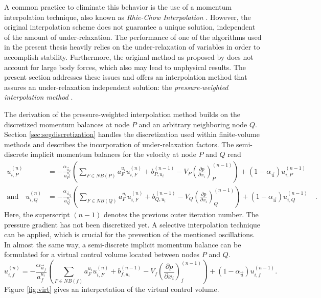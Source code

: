 A common practice to eliminate this behavior is the use of a momentum interpolation technique, also known as \emph{Rhie-Chow Interpolation} \cite{rhie82}. However, the original interpolation scheme does not guarantee a unique solution, independent of the amount of under-relaxation. The performance of one of the algorithms used in the present thesis heavily relies on the under-relaxation of variables in order to accomplish stability. Furthermore, the original method as proposed by \cite{rhie82} does not account for large body forces, which also may lead to unphysical results. The present section addresses these issues and offers an interpolation method that assures an under-relaxation independent solution: the \emph{pressure-weighted interpolation method} \cite{miller88}.

The derivation of the pressure-weighted interpolation method builds on the discretized momentum balances at node \(P\) and an arbitrary neighboring node \(Q\). Section \ref{sec:segdiscretization} handles the discretization used within finite-volume methods and describes the incorporation of under-relaxation factors. The semi-discrete implicit momentum balances for the velocity at node \(P\) and \(Q\) read
\begin{align*}
    u_{i,P}^{(n)} 
    &= 
    - \frac{\alpha_{\vec{u}_P}}{a_P^{u_i}} \left(\sum_{F \in NB(P)} a_F^{u_i} u_{i,F}^{(n)}
    +                                     b_{P,u_i}^{(n-1)} 
    -                                     V_P\left(\frac{\partial p}{\partial x_i}\right)_P^{(n-1)} \right)
    + \left(1 - \alpha_{\vec{u}}\right) u_{i,P}^{(n-1)}  \\[1em]
    \text{and} \quad
    u_{i,Q}^{(n)} 
    &= 
    - \frac{\alpha_{\vec{u}_Q}}{a_Q^{u_i}} \left(\sum_{F \in NB(Q)} a_F^{u_i} u_{i,F}^{(n)}
    +                                     b_{Q,u_i}^{(n-1)} 
    -                                     V_Q\left(\frac{\partial p}{\partial x_i}\right)_Q^{(n-1)}   \right)
    + \left(1 - \alpha_{\vec{u}}\right) u_{i,Q}^{(n-1)} \quad.
\end{align*}
Here, the superscript \((n-1)\) denotes the previous outer iteration number. The pressure gradient has not been discretized yet. A selective interpolation technique \cite{schaefer99} can be applied, which is crucial for the prevention of the mentioned oscillations. In almost the same way, a semi-discrete implicit momentum balance can be formulated for a virtual control volume located between nodes \(P\) and \(Q\). \begin{equation}
  \label{eq:virtualu}
  u_{i,f}^{(n)} 
  = 
  - \frac{\alpha_{\vec{u}_f}}{a_f^{u_i}} \left(\sum_{F \in NB(f)} a_F^{u_i} u_{i,F}^{(n)} 
  +                                     b_{f,u_i}^{(n-1)} 
  -                                     V_f\left(\frac{\partial p}{\partial x_i}\right)_f^{(n-1)}  \right)
  + \left(1 - \alpha_{\vec{u}}\right) u_{i,f}^{(n-1)}.
\end{equation}
Figure \ref{fig:virt} gives an interpretation of the virtual control volume.


